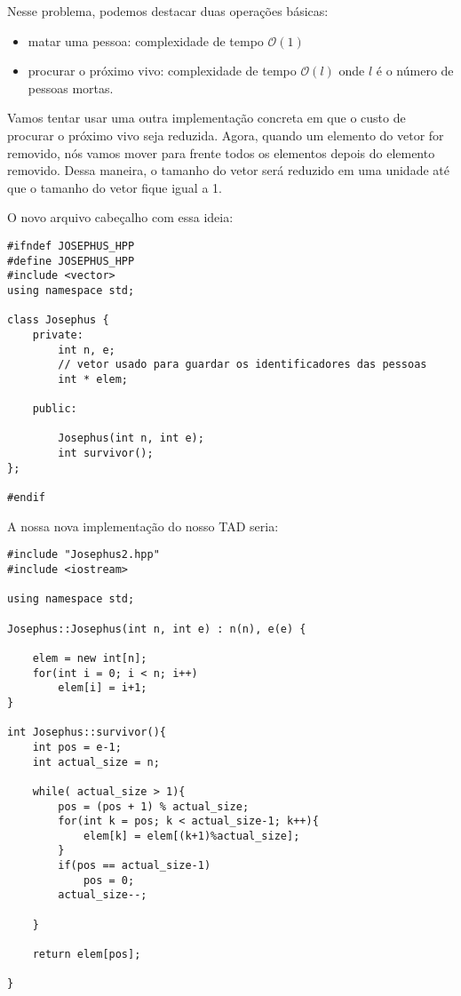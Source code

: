 Nesse problema, podemos destacar duas operações básicas:

\begin{itemize}
    \item matar uma pessoa: complexidade de tempo $\mathcal{O}(1)$
    \item procurar o próximo vivo: complexidade de tempo $\mathcal{O}(l)$ onde $l$ é o número de pessoas mortas.
\end{itemize}

Vamos tentar usar uma outra implementação concreta em que o custo de procurar o próximo vivo seja reduzida. Agora, quando um elemento do vetor for removido, nós vamos mover para frente todos os elementos depois do elemento removido. Dessa maneira, o tamanho do vetor será reduzido em uma unidade até que o tamanho do vetor fique igual a 1.

O novo arquivo cabeçalho com essa ideia:

\begin{verbatim}
#ifndef JOSEPHUS_HPP
#define JOSEPHUS_HPP
#include <vector>
using namespace std;

class Josephus {
    private:
        int n, e;
        // vetor usado para guardar os identificadores das pessoas    
        int * elem;

    public:
        
        Josephus(int n, int e);
        int survivor();
};

#endif
\end{verbatim}

A nossa nova implementação do nosso TAD seria:


\begin{verbatim}
#include "Josephus2.hpp"
#include <iostream>

using namespace std;

Josephus::Josephus(int n, int e) : n(n), e(e) {
    
    elem = new int[n];
    for(int i = 0; i < n; i++)
        elem[i] = i+1;
}

int Josephus::survivor(){
    int pos = e-1;
    int actual_size = n;
    
    while( actual_size > 1){
        pos = (pos + 1) % actual_size;
        for(int k = pos; k < actual_size-1; k++){
            elem[k] = elem[(k+1)%actual_size];
        }            
        if(pos == actual_size-1)
            pos = 0;
        actual_size--;

    }

    return elem[pos];

}\end{verbatim}

